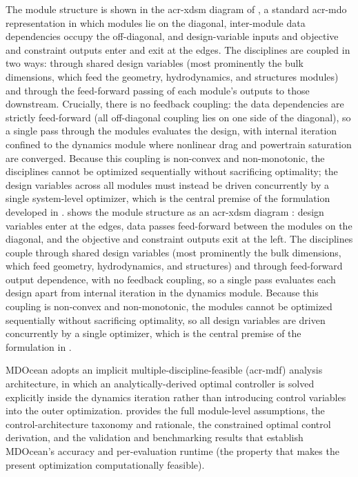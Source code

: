 \ifdefined\DISSERTATION
    The module structure is shown in the \gls{acr-xdsm} diagram of , a standard \gls{acr-mdo} representation \citep{lambe_extensions_2012} in which modules lie on the diagonal, inter-module data dependencies occupy the off-diagonal, and design-variable inputs and objective and constraint outputs enter and exit at the edges.
    The disciplines are coupled in two ways: through shared design variables (most prominently the bulk dimensions, which feed the geometry, hydrodynamics, and structures modules) and through the feed-forward passing of each module's outputs to those downstream.
    Crucially, there is no feedback coupling: the data dependencies are strictly feed-forward (all off-diagonal coupling lies on one side of the diagonal), so a single pass through the modules evaluates the design, with internal iteration confined to the dynamics module where nonlinear drag and powertrain saturation are converged.
    Because this coupling is non-convex and non-monotonic, the disciplines cannot be optimized sequentially without sacrificing optimality; the design variables across all modules must instead be driven concurrently by a single system-level optimizer, which is the central premise of the formulation developed in .
\else
     shows the module structure as an \gls{acr-xdsm} diagram \citep{lambe_extensions_2012}: design variables enter at the edges, data passes feed-forward between the modules on the diagonal, and the objective and constraint outputs exit at the left.
    The disciplines couple through shared design variables (most prominently the bulk dimensions, which feed geometry, hydrodynamics, and structures) and through feed-forward output dependence, with no feedback coupling, so a single pass evaluates each design apart from internal iteration in the dynamics module.
    Because this coupling is non-convex and non-monotonic, the modules cannot be optimized sequentially without sacrificing optimality, so all design variables are driven concurrently by a single optimizer, which is the central premise of the formulation in .
\fi

MDOcean adopts an implicit multiple-discipline-feasible (\gls{acr-mdf}) analysis architecture, in which an analytically-derived optimal controller is solved explicitly inside the dynamics iteration rather than introducing control variables into the outer optimization.
\citet{mccabe_development_2026} provides the full module-level assumptions, the control-architecture taxonomy and rationale, the constrained optimal control derivation, and the validation and benchmarking results that establish MDOcean's accuracy and \resultsRE[simRuntime] per-evaluation runtime (the property that makes the present optimization computationally feasible).
